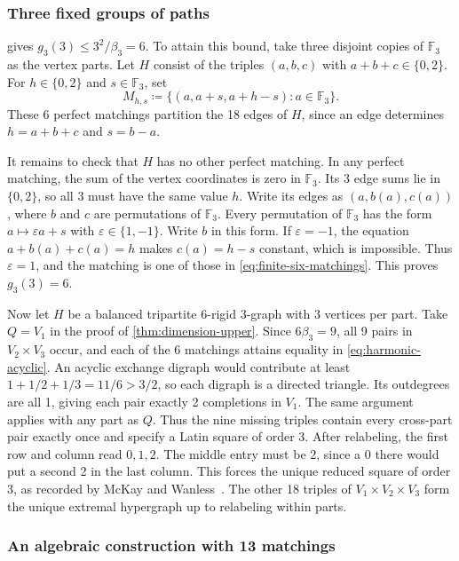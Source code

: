 \documentclass[10pt]{article}
\numberwithin{equation}{section}
\theoremstyle{definition}
\begin{document}
\subsubsection*{Three fixed groups of paths}

 gives $g_3(3)\le 3^2/\beta_3=6$. To attain this bound, take three disjoint copies of $\mathbb F_3$ as the vertex parts. Let $H$ consist of the triples $(a,b,c)$ with $a+b+c\in\{0,2\}$. For $h\in\{0,2\}$ and $s\in\mathbb F_3$, set
\begin{equation}
 M_{h,s}\coloneqq\{(a,a+s,a+h-s)\colon a\in\mathbb F_3\}.
 \label{eq:finite-six-matchings}
\end{equation}
These 6 perfect matchings partition the 18 edges of $H$, since an edge determines $h=a+b+c$ and $s=b-a$.

It remains to check that $H$ has no other perfect matching. In any perfect matching, the sum of the vertex coordinates is zero in $\mathbb F_3$. Its 3 edge sums lie in $\{0,2\}$, so all 3 must have the same value $h$. Write its edges as $(a,b(a),c(a))$, where $b$ and $c$ are permutations of $\mathbb F_3$. Every permutation of $\mathbb F_3$ has the form $a\mapsto\varepsilon a+s$ with $\varepsilon\in\{1,-1\}$. Write $b$ in this form. If $\varepsilon=-1$, the equation $a+b(a)+c(a)=h$ makes $c(a)=h-s$ constant, which is impossible. Thus $\varepsilon=1$, and the matching is one of those in \cref{eq:finite-six-matchings}. This proves $g_3(3)=6$.

Now let $H$ be a balanced tripartite $6$-rigid $3$-graph with 3 vertices per part. Take $Q=V_1$ in the proof of \cref{thm:dimension-upper}. Since $6\beta_3=9$, all 9 pairs in $V_2\times V_3$ occur, and each of the 6 matchings attains equality in \cref{eq:harmonic-acyclic}. An acyclic exchange digraph would contribute at least $1+1/2+1/3=11/6>3/2$, so each digraph is a directed triangle. Its outdegrees are all 1, giving each pair exactly 2 completions in $V_1$. The same argument applies with any part as $Q$. Thus the nine missing triples contain every cross-part pair exactly once and specify a Latin square of order 3. After relabeling, the first row and column read $0,1,2$. The middle entry must be 2, since a 0 there would put a second 2 in the last column. This forces the unique reduced square of order 3, as recorded by McKay and Wanless~\cite{McKayWanless2005}. The other 18 triples of $V_1\times V_2\times V_3$ form the unique extremal hypergraph up to relabeling within parts.

\subsubsection*{An algebraic construction with 13 matchings}
\end{document}

